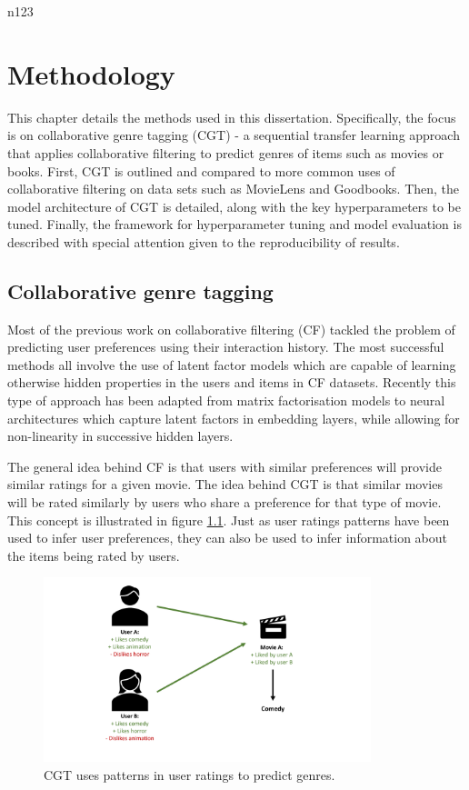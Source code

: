  n123\chapter{Methodology}
This chapter details the methods used in this dissertation. Specifically, the focus is on collaborative genre tagging (CGT) - a sequential transfer learning approach that applies collaborative filtering to predict genres of items such as movies or books. First, CGT is outlined and compared to more common uses of collaborative filtering on data sets such as MovieLens and Goodbooks. Then, the model architecture of CGT is detailed, along with the key hyperparameters to be tuned. Finally, the framework for hyperparameter tuning and model evaluation is described with special attention given to the reproducibility of results.

\section{Collaborative genre tagging}
Most of the previous work on collaborative filtering (CF) tackled the problem of predicting user preferences using their interaction history. The most successful methods all involve the use of latent factor models which are capable of learning otherwise hidden properties in the users and items in CF datasets. Recently this type of approach has been adapted from matrix factorisation models to neural architectures which capture latent factors in embedding layers, while allowing for non-linearity in successive hidden layers.

The general idea behind CF is that users with similar preferences will provide similar ratings for a given movie. The idea behind CGT is that similar movies will be rated similarly by users who share a preference for that type of movie. This concept is illustrated in figure \ref{fig:4_CGT-concept}. Just as user ratings patterns have been used to infer user preferences, they can also be used to infer information about the items being rated by users.

\begin{figure}[H]
\centering
\includegraphics[width=0.85\textwidth]{Figures/4_CGT-concept.pdf}
\decoRule
\caption[Collaborative genre tagging concept]{CGT uses patterns in user ratings to predict genres.}
\label{fig:4_CGT-concept}
\end{figure}

